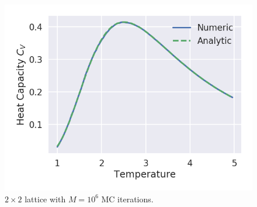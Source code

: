 \documentclass[aps,reprint]{revtex4-1}
\begin{document}
\begin{figure}[H]
  \centering
  \includegraphics[width=\columnwidth]{figures/L2Ne6.png}
  \caption{$2 \times 2$ lattice with $M = 10^6$ MC iterations.}
  \label{fig:L2Ne6}
\end{figure}
\end{document}
